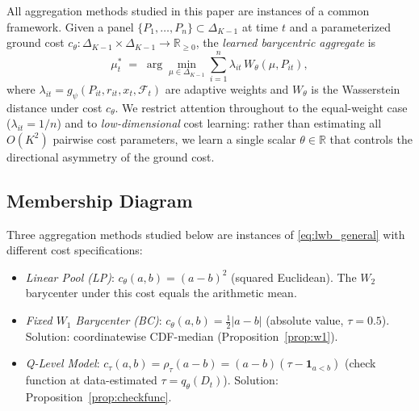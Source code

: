 All aggregation methods studied in this paper are instances of a common framework.
Given a panel $\{P_1,\ldots,P_n\} \subset \Delta_{K-1}$ at time $t$ and a
parameterized ground cost $c_\theta: \Delta_{K-1} \times \Delta_{K-1} \to \mathbb{R}_{\geq 0}$,
the \emph{learned barycentric aggregate} is
\begin{equation}
  \mu_t^* \;=\; \arg\min_{\mu \in \Delta_{K-1}}
    \sum_{i=1}^{n} \lambda_{it}\, W_\theta(\mu, P_{it}),
  \label{eq:lwb_general}
\end{equation}
where $\lambda_{it} = g_\psi(P_{it}, r_{it}, x_t, \mathcal{F}_t)$ are adaptive weights
and $W_\theta$ is the Wasserstein distance under cost $c_\theta$.
We restrict attention throughout to the equal-weight case ($\lambda_{it} = 1/n$) and
to \emph{low-dimensional} cost learning: rather than estimating all $O(K^2)$ pairwise
cost parameters, we learn a single scalar $\theta \in \mathbb{R}$ that controls the
directional asymmetry of the ground cost.

\subsection{Membership Diagram}

Three aggregation methods studied below are instances of \eqref{eq:lwb_general} with
different cost specifications:

\begin{itemize}
  \item \textit{Linear Pool (LP)}: $c_\theta(a,b) = (a - b)^2$ (squared Euclidean).
    The $W_2$ barycenter under this cost equals the arithmetic mean.
  \item \textit{Fixed $W_1$ Barycenter (BC)}: $c_\theta(a,b) = \tfrac{1}{2}|a-b|$
    (absolute value, $\tau = 0.5$).
    Solution: coordinatewise CDF-median (Proposition~\ref{prop:w1}).
  \item \textit{Q-Level Model}: $c_\tau(a,b) = \rho_\tau(a-b) = (a-b)(\tau - \mathbf{1}_{a<b})$
    (check function at data-estimated $\tau = q_\theta(D_t)$).
    Solution: Proposition~\ref{prop:checkfunc}.
\end{itemize}

